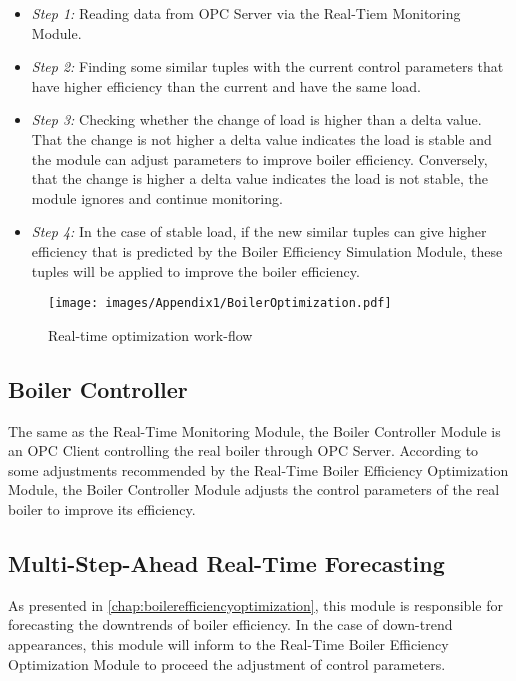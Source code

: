\begin{itemize}

\item \textit{Step 1:} Reading data from OPC Server via the Real-Tiem Monitoring Module.
\item \textit{Step 2:} Finding some similar tuples with the current control parameters that have higher efficiency than the current and have the same load.
\item \textit{Step 3:} Checking whether the change of load is higher than a delta value. That the change is not higher a delta value indicates the load is stable and the module can adjust parameters to improve boiler efficiency. Conversely, that the change is higher a delta value indicates the load is not stable, the module ignores and continue monitoring.
\item \textit{Step 4:} In the case of stable load, if the new similar tuples can give higher efficiency that is predicted by the Boiler Efficiency Simulation Module, these tuples will be applied to improve the boiler efficiency.

\end{itemize}

\begin{figure}[H]
  \centering
  \texttt{[image: images/Appendix1/BoilerOptimization.pdf]}
  \caption{Real-time optimization work-flow}
  \label{App:fig02}    
\end{figure}

\subsection{Boiler Controller}

The same as the Real-Time Monitoring Module, the Boiler Controller Module is an OPC Client controlling the real boiler through OPC Server. According to some adjustments recommended by the Real-Time Boiler Efficiency Optimization Module, the Boiler Controller Module adjusts the control parameters of the real boiler to improve its efficiency.

\subsection{Multi-Step-Ahead Real-Time Forecasting}

As presented in \ref{chap:boilerefficiencyoptimization}, this module is responsible for forecasting the downtrends of boiler efficiency. In the case of down-trend appearances, this module will inform to the Real-Time Boiler Efficiency Optimization Module to proceed the adjustment of control parameters.

